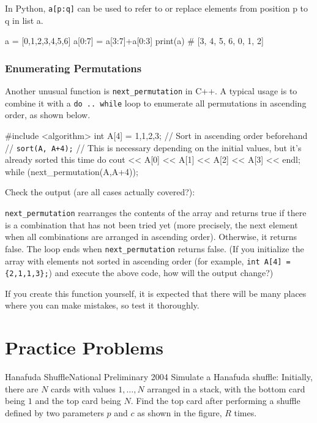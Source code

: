 In Python, \texttt{a[p:q]} can be used to refer to or replace elements from position p to q in list a.
\begin{pybox}
a = [0,1,2,3,4,5,6]
a[0:7] = a[3:7]+a[0:3]
print(a) # \dingright{} [3, 4, 5, 6, 0, 1, 2]
\end{pybox}

\subsubsection{Enumerating Permutations}

Another unusual function is \texttt{next\_permutation} in C++.
A typical usage is to combine it with a \texttt{do .. while} loop to enumerate all permutations in ascending order, as shown below.

\begin{cbox}
#include <algorithm>
    int A[4] = {1,1,2,3}; // Sort in ascending order beforehand
    // \texttt{sort(A, A+4);} // This is necessary depending on the initial values, but it's already sorted this time
    do {
        cout << A[0] << A[1] << A[2] << A[3] << endl;
    } while (next_permutation(A,A+4));
\end{cbox}

Check the output (are all cases actually covered?):


\texttt{next\_permutation} rearranges the contents of the array and returns true if there is a combination that has not been tried yet (more precisely, the next element when all combinations are arranged in ascending order). Otherwise, it returns false. The loop ends when \texttt{next\_permutation} returns false.
(If you initialize the array with elements not sorted in ascending order (for example, \texttt{int A[4] = \{2,1,1,3\};}) and execute the above code, how will the output change?)

If you create this function yourself, it is expected that there will be many places where you can make mistakes, so test it thoroughly.
\section{Practice Problems}

\begin{pbox}{Hanafuda Shuffle}{National Preliminary 2004}
Simulate a Hanafuda shuffle: Initially, there are $N$ cards with values $1,\ldots,N$ arranged in a stack, with the bottom card being $1$ and the top card being $N$. Find the top card after performing a shuffle defined by two parameters $p$ and $c$ as shown in the figure, $R$ times.

\end{pbox}

